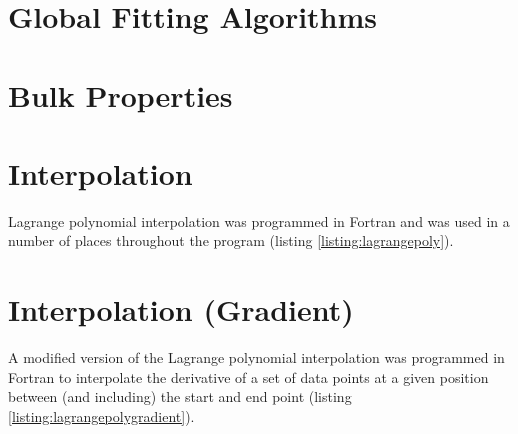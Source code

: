 



\section{Global Fitting Algorithms}
\label{section:globalfittingalgorithms}

\label{section:simulatedannealing}


\label{section:geneticalgorithm}





\section{Bulk Properties}
\label{section:appendixbpaddconfiguration}







\section{Interpolation}
\label{section:interpolationpseudo}

Lagrange polynomial interpolation was programmed in Fortran and was used in a number of places throughout the program (listing \ref{listing:lagrangepoly}).




\section{Interpolation (Gradient)}
\label{section:interpolationgradientpseudo}

A modified version of the Lagrange polynomial interpolation was programmed in Fortran to interpolate the derivative of a set of data points at a given position between (and including) the start and end point (listing \ref{listing:lagrangepolygradient}).


